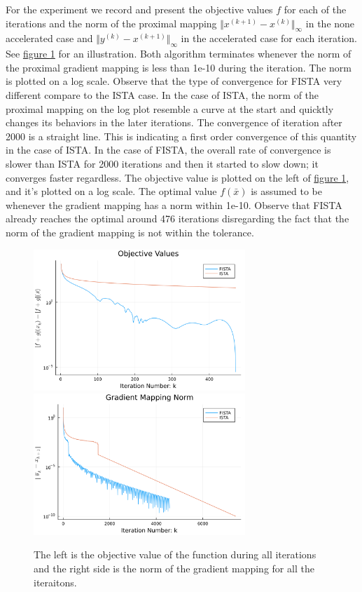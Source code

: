 \documentclass[]{article}
\theoremstyle{definition}
\begin{document}
        For the experiment we record and present the objective values $f$ for each of the iterations and the norm of the proximal mapping $\Vert x^{(k + 1)} - x^{(k)}\Vert_\infty$ in the none accelerated case and $\Vert y^{(k)} - x^{(k + 1)}\Vert_\infty$ in the accelerated case for each iteration. See \hyperref[fig:lasso_1]{figure \ref*{fig:lasso_1}} for an illustration. Both algorithm terminates whenever the norm of the proximal gradient mapping is less than 1e-10 during the iteration. The norm is plotted on a log scale. Observe that the type of convergence for FISTA very different compare to the ISTA case. In the case of ISTA, the norm of the proximal mapping on the log plot resemble a curve at the start and quicktly changes its behaviors in the later iterations. The convergence of iteration after 2000 is a straight line. This is indicating a first order convergence of this quantity in the case of ISTA. In the case of FISTA, the overall rate of convergence is slower than ISTA for 2000 iterations and then it started to slow down; it converges faster regardless. The objective value is plotted on the left of \hyperref[fig:lasso_1]{figure \ref*{fig:lasso_1}}, and it's plotted on a log scale. The optimal value $f(\bar x)$ is assumed to be whenever the gradient mapping has a norm within 1e-10. Observe that FISTA already reaches the optimal around 476 iterations disregarding the fact that the norm of the gradient mapping is not within the tolerance. 
        \begin{figure}[h]
            \centering
            \includegraphics*[width=8cm]{simple_lass_obj.png}
                \includegraphics*[width=8cm]{simple_lass_pgrad.png}
            \caption{The left is the objective value of the function during all iterations and the right side is the norm of the gradient mapping for all the iteraitons. }
            \label{fig:lasso_1}
        \end{figure}
\end{document}
